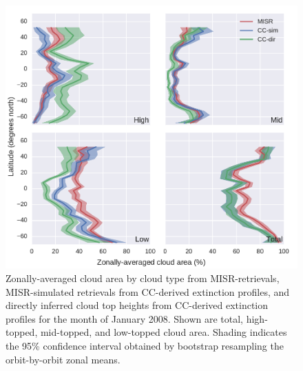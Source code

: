 \begin{figure}
\centering
\includegraphics[width=\columnwidth]{graphics/misr_cldmisr_zonal_2008-01.pdf}
\caption{Zonally-averaged cloud area by cloud type from MISR-retrievals, MISR-simulated retrievals from CC-derived extinction profiles, and directly inferred cloud top heights from CC-derived extinction profiles for the month of January 2008. Shown are total, high-topped, mid-topped, and low-topped cloud area. Shading indicates the 95\% confidence interval obtained by bootstrap resampling the orbit-by-orbit zonal means.}
\label{misr_cldmisr_zonal_jan}
\end{figure}

